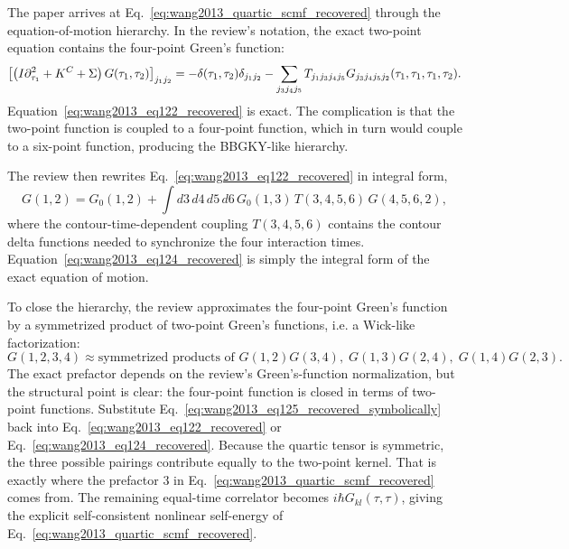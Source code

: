 The paper arrives at Eq.~\eqref{eq:wang2013_quartic_scmf_recovered} through the equation-of-motion hierarchy. In the review's notation, the exact two-point equation contains the four-point Green's function:
\begin{equation}
    \left[ \left( I\partial_{\tau_1}^2 + K^C + \Sigma \right)G(\tau_1,\tau_2) \right]_{j_1j_2}
    =
    -\delta(\tau_1,\tau_2)\delta_{j_1j_2}
    -
    \sum_{j_3j_4j_5}
    T_{j_1j_3j_4j_5}
    G_{j_3j_4j_5j_2}(\tau_1,\tau_1,\tau_1,\tau_2).
    \label{eq:wang2013_eq122_recovered}
\end{equation}
Equation~\eqref{eq:wang2013_eq122_recovered} is exact. The complication is that the two-point function is coupled to a four-point function, which in turn would couple to a six-point function, producing the BBGKY-like hierarchy.

The review then rewrites Eq.~\eqref{eq:wang2013_eq122_recovered} in integral form,
\begin{equation}
    G(1,2)
    =
    G_0(1,2)
    +
    \int d3\,d4\,d5\,d6\,
    G_0(1,3)\,
    T(3,4,5,6)\,
    G(4,5,6,2),
    \label{eq:wang2013_eq124_recovered}
\end{equation}
where the contour-time-dependent coupling $T(3,4,5,6)$ contains the contour delta functions needed to synchronize the four interaction times. Equation~\eqref{eq:wang2013_eq124_recovered} is simply the integral form of the exact equation of motion.

To close the hierarchy, the review approximates the four-point Green's function by a symmetrized product of two-point Green's functions, i.e. a Wick-like factorization:
\begin{equation}
    G(1,2,3,4)
    \approx
    \text{symmetrized products of } G(1,2)G(3,4),\;
    G(1,3)G(2,4),\;
    G(1,4)G(2,3).
    \label{eq:wang2013_eq125_recovered_symbolically}
\end{equation}
The exact prefactor depends on the review's Green's-function normalization, but the structural point is clear: the four-point function is closed in terms of two-point functions. Substitute Eq.~\eqref{eq:wang2013_eq125_recovered_symbolically} back into Eq.~\eqref{eq:wang2013_eq122_recovered} or Eq.~\eqref{eq:wang2013_eq124_recovered}. Because the quartic tensor is symmetric, the three possible pairings contribute equally to the two-point kernel. That is exactly where the prefactor $3$ in Eq.~\eqref{eq:wang2013_quartic_scmf_recovered} comes from. The remaining equal-time correlator becomes $i\hbar G_{kl}(\tau,\tau)$, giving the explicit self-consistent nonlinear self-energy of Eq.~\eqref{eq:wang2013_quartic_scmf_recovered}.

